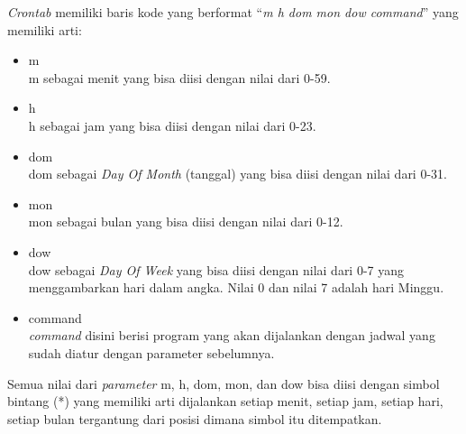 \textit{Crontab} memiliki baris kode yang berformat ``\textit{m h dom mon dow command}'' yang memiliki arti:
\begin{itemize}
	\item m\\
	m sebagai menit yang bisa diisi dengan nilai dari 0-59. 
	\item h\\
	h sebagai jam yang bisa diisi dengan nilai dari 0-23.
	\item dom\\
	dom sebagai \textit{Day Of Month} (tanggal) yang bisa diisi dengan nilai dari 0-31.
	\item mon\\
	mon sebagai bulan yang bisa diisi dengan nilai dari 0-12.
	\item dow\\
	dow sebagai \textit{Day Of Week} yang bisa diisi dengan nilai dari 0-7 yang menggambarkan hari dalam angka. Nilai 0 dan nilai 7 adalah hari Minggu. 
	\item command\\
	\textit{command} disini berisi program yang akan dijalankan dengan jadwal yang sudah diatur dengan parameter sebelumnya. 
\end{itemize}

Semua nilai dari \textit{parameter} m, h, dom, mon, dan dow bisa diisi dengan simbol bintang (*) yang memiliki arti dijalankan setiap menit, setiap jam, setiap hari, setiap bulan tergantung dari posisi dimana simbol itu ditempatkan. 
 
